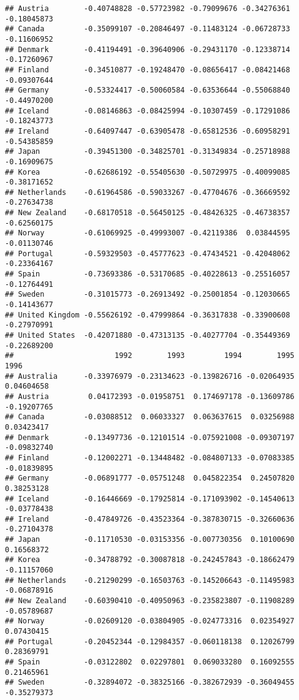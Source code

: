 \documentclass[
]{article}
\begin{document}
\begin{verbatim}
## Austria        -0.40748828 -0.57723982 -0.79099676 -0.34276361 -0.18045873
## Canada         -0.35099107 -0.20846497 -0.11483124 -0.06728733 -0.11606952
## Denmark        -0.41194491 -0.39640906 -0.29431170 -0.12338714 -0.17260967
## Finland        -0.34510877 -0.19248470 -0.08656417 -0.08421468 -0.09307644
## Germany        -0.53324417 -0.50060584 -0.63536644 -0.55068840 -0.44970200
## Iceland        -0.08146863 -0.08425994 -0.10307459 -0.17291086 -0.18243773
## Ireland        -0.64097447 -0.63905478 -0.65812536 -0.60958291 -0.54385859
## Japan          -0.39451300 -0.34825701 -0.31349834 -0.25718988 -0.16909675
## Korea          -0.62686192 -0.55405630 -0.50729975 -0.40099085 -0.38171652
## Netherlands    -0.61964586 -0.59033267 -0.47704676 -0.36669592 -0.27634738
## New Zealand    -0.68170518 -0.56450125 -0.48426325 -0.46738357 -0.62560175
## Norway         -0.61069925 -0.49993007 -0.42119386  0.03844595 -0.01130746
## Portugal       -0.59329503 -0.45777623 -0.47434521 -0.42048062 -0.23364167
## Spain          -0.73693386 -0.53170685 -0.40228613 -0.25516057 -0.12764491
## Sweden         -0.31015773 -0.26913492 -0.25001854 -0.12030665 -0.14143677
## United Kingdom -0.55626192 -0.47999864 -0.36317838 -0.33900608 -0.27970991
## United States  -0.42071880 -0.47313135 -0.40277704 -0.35449369 -0.22689200
##                       1992        1993         1994        1995        1996
## Australia      -0.33976979 -0.23134623 -0.139826716 -0.02064935  0.04604658
## Austria         0.04172393 -0.01958751  0.174697178 -0.13609786 -0.19207765
## Canada         -0.03088512  0.06033327  0.063637615  0.03256988  0.03423417
## Denmark        -0.13497736 -0.12101514 -0.075921008 -0.09307197 -0.09832740
## Finland        -0.12002271 -0.13448482 -0.084807133 -0.07083385 -0.01839895
## Germany        -0.06891777 -0.05751248  0.045822354  0.24507820  0.38253128
## Iceland        -0.16446669 -0.17925814 -0.171093902 -0.14540613 -0.03778438
## Ireland        -0.47849726 -0.43523364 -0.387830715 -0.32660636 -0.27104378
## Japan          -0.11710530 -0.03153356 -0.007730356  0.10100690  0.16568372
## Korea          -0.34788792 -0.30087818 -0.242457843 -0.18662479 -0.11157060
## Netherlands    -0.21290299 -0.16503763 -0.145206643 -0.11495983 -0.06878916
## New Zealand    -0.60390410 -0.40950963 -0.235823807 -0.11908289 -0.05789687
## Norway         -0.02609120 -0.03804905 -0.024773316  0.02354927  0.07430415
## Portugal       -0.20452344 -0.12984357 -0.060118138  0.12026799  0.28369791
## Spain          -0.03122802  0.02297801  0.069033280  0.16092555  0.21465961
## Sweden         -0.32894072 -0.38325166 -0.382672939 -0.36049455 -0.35279373

\end{verbatim}
\end{document}
